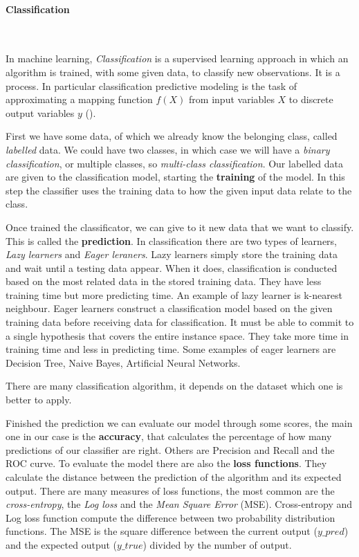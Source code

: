 \paragraph{Classification}\
\vspace{0.5cm}

In machine learning, \emph{Classification} is a supervised learning approach in which an algorithm is trained, with some given data, to classify new observations. It is a process. In particular classification predictive modeling is the task of approximating a mapping function $f(X)$ from input variables $X$ to discrete output variables $y$ (\cite{classification}).
\vspace{0.5cm}

First we have some data, of which we already know the belonging class, called \emph{labelled} data. We could have two classes, in which case we will have a \emph{binary classification}, or multiple classes, so \emph{multi-class classification}. Our labelled data are given to the classification model, starting the \textbf{training} of the model. In this step the classifier uses the training data to how the given input data relate to the class.
\vspace{0.5cm}

Once trained the classificator, we can give to it new data that we want to classify. This is called the \textbf{prediction}. In classification there are two types of learners, \textit{Lazy learners} and \textit{Eager leraners}. Lazy learners simply store the training data and wait until a testing data appear. When it does, classification is conducted based on the most related data in the stored training data. They have less training time but more predicting time. An example of lazy learner is k-nearest neighbour. Eager learners construct a classification model based on the given training data before receiving data for classification. It must be able to commit to a single hypothesis that covers the entire instance space. They take more time in training time and less in predicting time. Some examples of eager learners are Decision Tree, Naive Bayes, Artificial Neural Networks. 
\vspace{0.5cm}

There are many classification algorithm, it depends on the dataset which one is better to apply. 
\vspace{0.5cm}

Finished the prediction we can evaluate our model through some scores, the main one in our case is the \textbf{accuracy}, that calculates the percentage of how many predictions of our classifier are right. Others are Precision and Recall and the ROC curve. To evaluate the model there are also the \textbf{loss functions}. They calculate the distance between the prediction of the algorithm and its expected output. There are many measures of loss functions, the most common are the \textit{cross-entropy}, the \textit{Log loss} and the \textit{Mean Square Error} (MSE). Cross-entropy and Log loss function compute the difference between two probability distribution functions. The MSE is the square difference between the current output ($y\_pred$) and the expected output ($y\_true$) divided by the number of output. 

